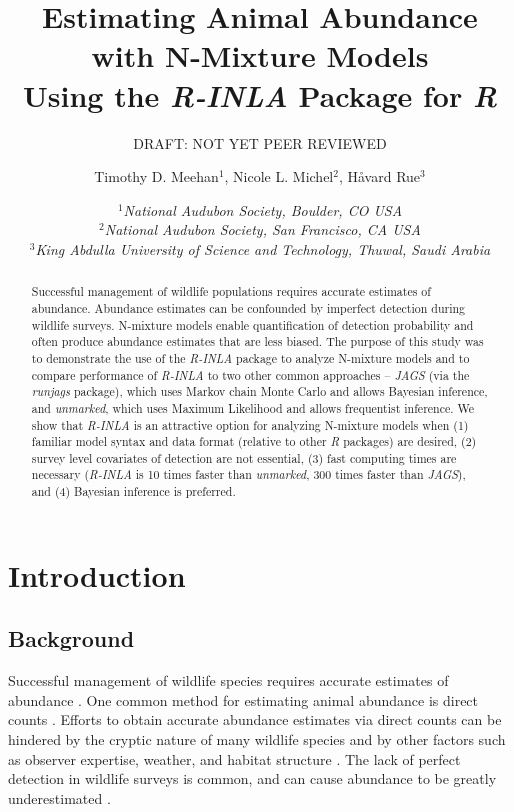 \documentclass{article}
\title{	Estimating Animal Abundance with N-Mixture Models \\ Using the \emph{R-INLA} Package for \emph{R}}
\subtitle{DRAFT: NOT YET PEER REVIEWED}
\author{Timothy D. Meehan$^1$, Nicole L. Michel$^2$, H{\aa}vard Rue$^3$}
\date{
	$^1$\emph{National Audubon Society, Boulder, CO USA\\}
	$^2$\emph{National Audubon Society, San Francisco, CA USA\\}
	$^3$\emph{King Abdulla University of Science and Technology, Thuwal, Saudi Arabia\\}
}
\begin{document}
\maketitle

\begin{abstract}
	\fontsize{10pt}{11pt}\selectfont
	Successful management of wildlife populations requires accurate estimates of abundance. Abundance estimates can be confounded by imperfect detection during wildlife surveys. N-mixture models enable quantification of detection probability and often produce abundance estimates that are less biased. The purpose of this study was to demonstrate the use of the \emph{R-INLA} package to analyze N-mixture models and to compare performance of \emph{R-INLA} to two other common approaches -- \emph{JAGS} (via the \emph{runjags} package), which uses Markov chain Monte Carlo and allows Bayesian inference, and \emph{unmarked}, which uses Maximum Likelihood and allows frequentist inference. We show that \emph{R-INLA} is an attractive option for analyzing N-mixture models when (1) familiar model syntax and data format (relative to other \emph{R} packages) are desired, (2) survey level covariates of detection are not essential, (3) fast computing times are necessary (\emph{R-INLA} is 10 times faster than \emph{unmarked}, 300 times faster than \emph{JAGS}), and (4) Bayesian inference is preferred.
\end{abstract}

\fontsize{11pt}{12pt}\selectfont
\section[Introduction]{Introduction}
\subsection[Background]{Background}
Successful management of wildlife species requires accurate estimates of abundance \citep{Yoccoz_Nichols_Boulinier_2001}. One common method for estimating animal abundance is direct counts \citep{Pollock_Nichols_Simons_Farnsworth_Bailey_Sauer_2002}. Efforts to obtain accurate abundance estimates via direct counts can be hindered by the cryptic nature of many wildlife species and by other factors such as observer expertise, weather, and habitat structure \citep{Denes_Silveira_Beissinger_2015}. The lack of perfect detection in wildlife surveys is common, and can cause abundance to be greatly underestimated \citep{Wenger_Freeman_2008, Joseph_Elkin_Martin_Possingham_2009}.
\end{document}
